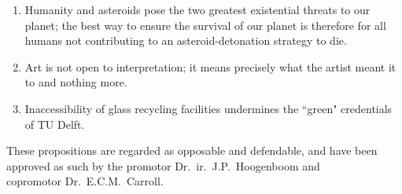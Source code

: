 \begin{enumerate}
    \item Humanity and asteroids pose the two greatest existential threats to our planet; the best way to ensure the survival of our planet is therefore for all humans not contributing to an asteroid-detonation strategy to die.
    \item Art is not open to interpretation; it means precisely what the artist meant it to and nothing more.
    \item Inaccessibility of glass recycling facilities undermines the ``green" credentials of TU Delft.
\end{enumerate}

\vfill
\begin{center}
    These propositions are regarded as opposable and defendable, and have been approved as such by the promotor Dr.\ ir.\ J.P.\ Hoogenboom and \\
    copromotor Dr.\ E.C.M.\ Carroll.
\end{center}
